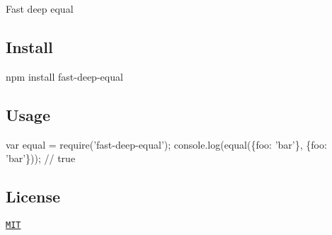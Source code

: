 Fast deep equal

\href{https://travis-ci.org/epoberezkin/fast-deep-equal}{\tt } \href{http://badge.fury.io/js/fast-deep-equal}{\tt } \href{https://coveralls.io/github/epoberezkin/fast-deep-equal?branch=master}{\tt }

\subsection*{Install}


\begin{DoxyCode}
npm install fast-deep-equal
\end{DoxyCode}


\subsection*{Usage}


\begin{DoxyCode}
var equal = require('fast-deep-equal');
console.log(equal(\{foo: 'bar'\}, \{foo: 'bar'\})); // true
\end{DoxyCode}


\subsection*{License}

\href{https://github.com/epoberezkin/fast-deep-equal/blob/master/LICENSE}{\tt M\+IT} 